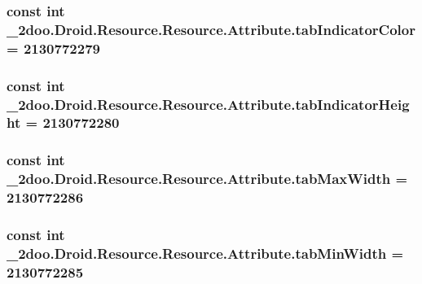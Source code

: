 \hypertarget{class__2doo_1_1_droid_1_1_resource_1_1_attribute_0f93dc8f399ac0a072320a2885b6eb18}{
\subsubsection[{tabIndicatorColor}]{\setlength{\rightskip}{0pt plus 5cm}const int \_\-2doo.Droid.Resource.Resource.Attribute.tabIndicatorColor = 2130772279}}
\label{class__2doo_1_1_droid_1_1_resource_1_1_attribute_0f93dc8f399ac0a072320a2885b6eb18}


\hypertarget{class__2doo_1_1_droid_1_1_resource_1_1_attribute_6eb7260ea053804731e91fa19156ab4d}{
\subsubsection[{tabIndicatorHeight}]{\setlength{\rightskip}{0pt plus 5cm}const int \_\-2doo.Droid.Resource.Resource.Attribute.tabIndicatorHeight = 2130772280}}
\label{class__2doo_1_1_droid_1_1_resource_1_1_attribute_6eb7260ea053804731e91fa19156ab4d}


\hypertarget{class__2doo_1_1_droid_1_1_resource_1_1_attribute_39dd67ca76a2d7803d3426bc7411249d}{
\subsubsection[{tabMaxWidth}]{\setlength{\rightskip}{0pt plus 5cm}const int \_\-2doo.Droid.Resource.Resource.Attribute.tabMaxWidth = 2130772286}}
\label{class__2doo_1_1_droid_1_1_resource_1_1_attribute_39dd67ca76a2d7803d3426bc7411249d}


\hypertarget{class__2doo_1_1_droid_1_1_resource_1_1_attribute_bd035aa86fe0e878682ff742637963f1}{
\subsubsection[{tabMinWidth}]{\setlength{\rightskip}{0pt plus 5cm}const int \_\-2doo.Droid.Resource.Resource.Attribute.tabMinWidth = 2130772285}}
\label{class__2doo_1_1_droid_1_1_resource_1_1_attribute_bd035aa86fe0e878682ff742637963f1}


